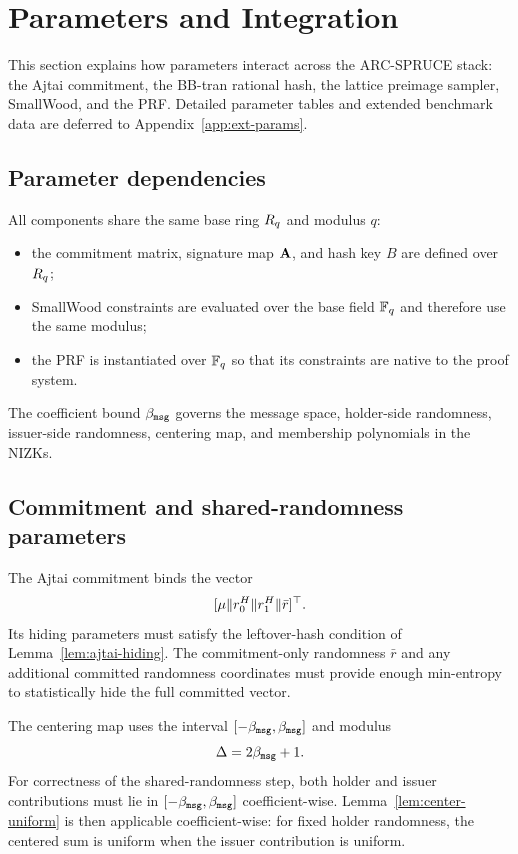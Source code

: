 \section{Parameters and Integration}
\label{sec:parameters}

This section explains how parameters interact across the ARC-SPRUCE stack: the Ajtai commitment, the BB-tran rational
hash, the lattice preimage sampler, SmallWood, and the PRF.  Detailed parameter tables and extended benchmark data are
deferred to Appendix~\ref{app:ext-params}.

\subsection{Parameter dependencies}
All components share the same base ring $R_q$ and modulus $q$:
\begin{itemize}[leftmargin=1.25em]
  \item the commitment matrix, signature map $\mathbf{A}$, and hash key $B$ are defined over $R_q$;
  \item SmallWood constraints are evaluated over the base field $\mathbb{F}_q$ and therefore use the same modulus;
  \item the PRF is instantiated over $\mathbb{F}_q$ so that its constraints are native to the proof system.
\end{itemize}
The coefficient bound $\beta_{\mathtt{msg}}$ governs the message space, holder-side randomness, issuer-side randomness,
centering map, and membership polynomials in the NIZKs.

\subsection{Commitment and shared-randomness parameters}
The Ajtai commitment binds the vector
\[
  [\mathbf{\mu}\Vert r_0^H\Vert r_1^H\Vert\bar r]^\top.
\]
Its hiding parameters must satisfy the leftover-hash condition of Lemma~\ref{lem:ajtai-hiding}.  The
commitment-only randomness $\bar r$ and any additional committed randomness coordinates must provide enough
min-entropy to statistically hide the full committed vector.

The centering map uses the interval $[-\beta_{\mathtt{msg}},\beta_{\mathtt{msg}}]$ and modulus
\[
  \Delta=2\beta_{\mathtt{msg}}+1.
\]
For correctness of the shared-randomness step, both holder and issuer contributions must lie in
$[-\beta_{\mathtt{msg}},\beta_{\mathtt{msg}}]$ coefficient-wise.  Lemma~\ref{lem:center-uniform} is then applicable coefficient-wise:
for fixed holder randomness, the centered sum is uniform when the issuer contribution is uniform.

